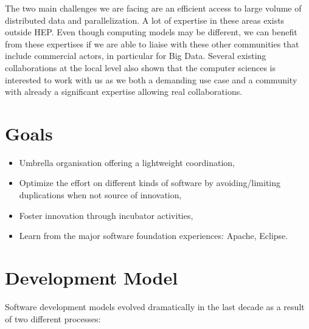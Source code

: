 \documentclass[11pt]{article} %
\begin{document}
The two main challenges we are facing are an efficient access to large
volume of distributed data and parallelization. A lot of expertise in
these areas exists outside HEP. Even though computing models may be
different, we can benefit from these expertises if we are able to
liaise with these other communities that include commercial actors,
in particular for Big Data. Several existing collaborations at the
local level also shown that the computer sciences is interested to
work with us as we both a demanding use case and a community with
already a significant expertise allowing real collaborations.

\section{Goals}

\begin{itemize}
\item
Umbrella organisation offering a lightweight coordination,

\item
Optimize the effort on different kinds of software by
avoiding/limiting duplications when not source of innovation,

\item
Foster innovation through incubator activities,

\item
Learn from the major software foundation experiences: Apache, Eclipse.

\end{itemize}

\section{Development Model}

Software development models evolved dramatically in the last decade as
a result of two different processes:
\end{document}
